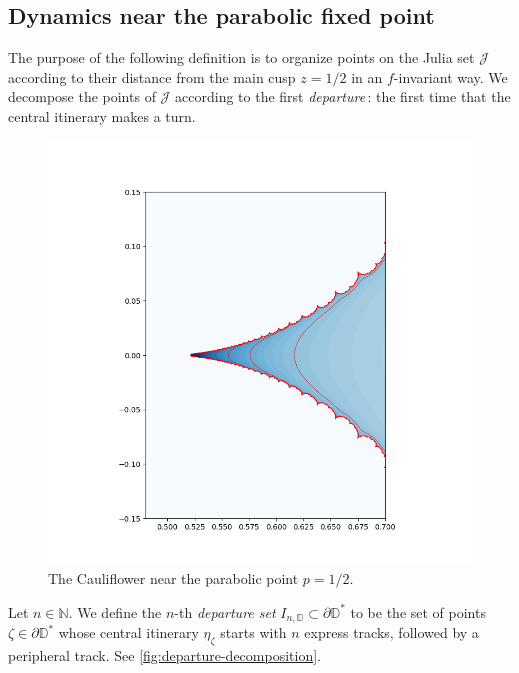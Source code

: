 \subsection{Dynamics near the parabolic fixed point}

The purpose of the following definition is to organize points on the Julia set $\mathcal J$ according to their distance from the main cusp $z=1/2$ in an $f$-invariant way. We decompose the points of $\mathcal J$ according to the first \emph{departure}\,: the first time that the central itinerary makes a turn.

\begin{figure}
    \centering
    \includegraphics[width=\textwidth]{cauliflower_equipotentials2.png}
    \caption{The Cauliflower near the parabolic point $p=1/2$.}
    \label{fig:my_figure}
\end{figure}

\begin{definition}

Let $n \in \mathbb N$. We define the $n$-th \emph{departure set} $I_{n, \mathbb D} \subset \partial \mathbb D ^*$ to be the set of points $\zeta \in \partial \mathbb D^*$ whose central itinerary $\eta_{\zeta}$ starts with $n$ express tracks, followed by a peripheral track.
See \cref{fig:departure-decomposition}.
\end{definition}

